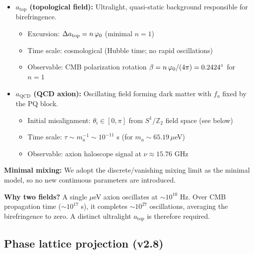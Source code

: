 \begin{tcolorbox}[colback=orange!5, colframe=orange!60!black, 
    title={\textbf{Two-Field Axion Structure}}, fonttitle=\bfseries]
\begin{itemize}[leftmargin=1.5em, topsep=2pt, itemsep=2pt]
    \item \textbf{$a_{\text{top}}$ (topological field):} Ultralight, quasi-static background
        responsible for birefringence.
        \begin{itemize}[leftmargin=1em, topsep=1pt]
            \item Excursion: $\Delta a_{\text{top}} = n\,\varphi_0$ (minimal $n=1$)
            \item Time scale: cosmological (Hubble time; no rapid oscillations)
            \item Observable: CMB polarization rotation $\beta = n\,\varphi_0/(4\pi) = 0.2424^\circ$ for $n=1$
        \end{itemize}
    \item \textbf{$a_{\text{QCD}}$ (QCD axion):} Oscillating field forming dark matter with
        $f_a$ fixed by the PQ block.
        \begin{itemize}[leftmargin=1em, topsep=1pt]
            \item Initial misalignment: $\theta_i \in [0,\pi]$ from $S^1/\mathbb{Z}_2$ field space (see below)
            \item Time scale: $\tau \sim m_a^{-1} \sim 10^{-11}$ s (for $m_a \sim 65.19\,\mu$eV)
            \item Observable: axion haloscope signal at $\nu \approx 15.76$ GHz
        \end{itemize}
\end{itemize}

\textbf{Minimal mixing:} We adopt the discrete/vanishing mixing limit as the minimal model,
so no new continuous parameters are introduced.
\end{tcolorbox}
\textbf{Why two fields?} A single $\mu$eV axion oscillates at $\sim 10^{10}$ Hz. Over CMB 
propagation time ($\sim 10^{17}$ s), it completes $\sim 10^{27}$ oscillations, averaging 
the birefringence to zero. A distinct ultralight $a_{\text{top}}$ is therefore required.

\subsection{Phase lattice projection (v2.8)}
\label{sec:phase-lattice}

